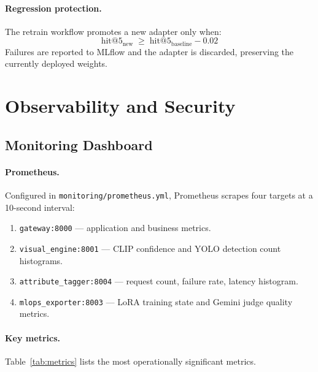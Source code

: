 \documentclass[12pt]{article}
\begin{document}
\paragraph{Regression protection.}
The retrain workflow promotes a new adapter only when:
\[
  \text{hit@5}_{\text{new}} \;\ge\; \text{hit@5}_{\text{baseline}} - 0.02
\]
Failures are reported to MLflow and the adapter is discarded, preserving the currently deployed weights.

\section{Observability and Security}

\subsection{Monitoring Dashboard}

\paragraph{Prometheus.}
Configured in \texttt{monitoring/prometheus.yml}, Prometheus scrapes four targets at a 10-second interval:

\begin{enumerate}[leftmargin=*]
  \item \texttt{gateway:8000} --- application and business metrics.
  \item \texttt{visual\_engine:8001} --- CLIP confidence and YOLO detection count histograms.
  \item \texttt{attribute\_tagger:8004} --- request count, failure rate, latency histogram.
  \item \texttt{mlops\_exporter:8003} --- LoRA training state and Gemini judge quality metrics.
\end{enumerate}

\paragraph{Key metrics.} Table~\ref{tab:metrics} lists the most operationally significant metrics.
\end{document}
